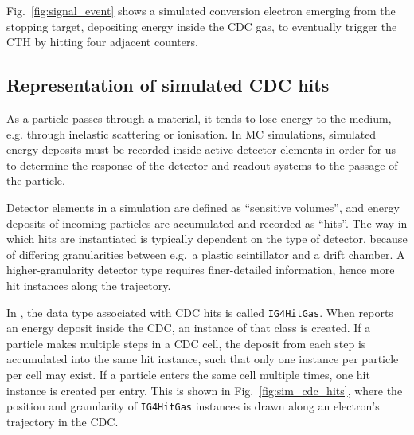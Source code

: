 Fig.~\ref{fig:signal_event} shows a simulated conversion electron emerging from the stopping target, depositing energy inside the CDC gas, to eventually trigger the CTH by hitting four adjacent counters. 

\subsection{Representation of simulated CDC hits}
\label{subsec:SD}
As a particle passes through a material, it tends to lose energy to the medium, e.g. through inelastic scattering or ionisation. 
In MC simulations, simulated energy deposits must be recorded inside active detector elements in order for us to determine the response of the detector and readout systems to the passage of the particle.

Detector elements in a \Geant simulation are defined as ``sensitive volumes'', and energy deposits of incoming particles are accumulated and recorded as ``hits''. 
The way in which hits are instantiated is typically dependent on the type of detector, because of differing granularities between e.g.\ a plastic scintillator and a drift chamber. A higher-granularity detector type requires finer-detailed information, hence more hit instances along the trajectory.

In \SimG, the data type associated with CDC hits is called \texttt{IG4HitGas}. When \Geant reports an energy deposit inside the CDC, an instance of that class is created. If a particle makes multiple steps in a CDC cell, the deposit from each step is accumulated into the same hit instance, such that only one instance per particle per cell may exist. If a particle enters the same cell multiple times, one hit instance is created per entry.
This is shown in Fig.~\ref{fig:sim_cdc_hits}, where the position and granularity of \texttt{IG4HitGas} instances is drawn along an electron's trajectory in the CDC.




